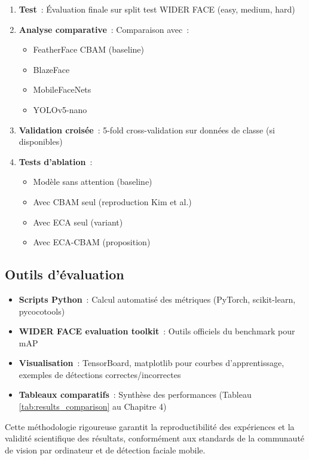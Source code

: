 \begin{onehalfspace}
\begin{enumerate}
\item \textbf{Test}~: Évaluation finale sur split test WIDER FACE (easy, medium, hard)

\item \textbf{Analyse comparative}~: Comparaison avec~:
   \begin{itemize}
   \item FeatherFace CBAM (baseline) \cite{Kim2025FeatherFace}
   \item BlazeFace \cite{Zhang2019BlazeFace}
   \item MobileFaceNets \cite{Chen2018MobileFaceNets}
   \item YOLOv5-nano \cite{Jocher2023YOLOv5}
   \end{itemize}

\item \textbf{Validation croisée}~: 5-fold cross-validation sur données de classe (si disponibles)

\item \textbf{Tests d'ablation}~:
   \begin{itemize}
   \item Modèle sans attention (baseline)
   \item Avec CBAM seul (reproduction Kim et al.)
   \item Avec ECA seul (variant)
   \item Avec ECA-CBAM (proposition)
   \end{itemize}
\end{enumerate}

\subsection{Outils d'évaluation}

\begin{itemize}
\item \textbf{Scripts Python}~: Calcul automatisé des métriques (PyTorch, scikit-learn, pycocotools)
\item \textbf{WIDER FACE evaluation toolkit}~: Outils officiels du benchmark pour mAP
\item \textbf{Visualisation}~: TensorBoard, matplotlib pour courbes d'apprentissage, exemples de détections correctes/incorrectes
\item \textbf{Tableaux comparatifs}~: Synthèse des performances (Tableau \ref{tab:results_comparison} au Chapitre 4)
\end{itemize}

\hspace{0.65 cm}Cette méthodologie rigoureuse garantit la reproductibilité des expériences et la validité scientifique des résultats, conformément aux standards de la communauté de vision par ordinateur et de détection faciale mobile.

\end{onehalfspace}
